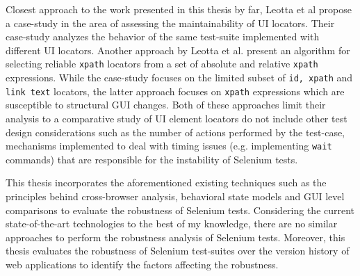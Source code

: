Closest approach to the work presented in this thesis by far, Leotta et al\cite{leotta2013comparing} propose a case-study in the area of assessing the maintainability of UI locators. Their case-study analyzes the behavior of the same test-suite implemented with different UI locators. Another approach by Leotta et al. present an algorithm for selecting reliable \texttt{xpath} locators from a set of absolute and relative \texttt{xpath} expressions. While the case-study focuses on the limited subset of \texttt{id, xpath} and \texttt{link text} locators, the latter approach focuses on \texttt{xpath} expressions which are susceptible to structural GUI changes. Both of these approaches limit their analysis to a comparative study of UI element locators do not include other test design considerations such as the number of actions performed by the test-case, mechanisms implemented to deal with timing issues (e.g. implementing \texttt{wait} commands) that are responsible for the instability of Selenium tests. 

This thesis incorporates the aforementioned existing techniques such as the principles behind cross-browser analysis, behavioral state models and GUI level comparisons to evaluate the robustness of Selenium tests. Considering the current state-of-the-art technologies to the best of my knowledge, there are no similar approaches to perform the robustness analysis of Selenium tests. Moreover, this thesis evaluates the robustness of Selenium test-suites over the version history of web applications to identify the factors affecting the robustness. 

